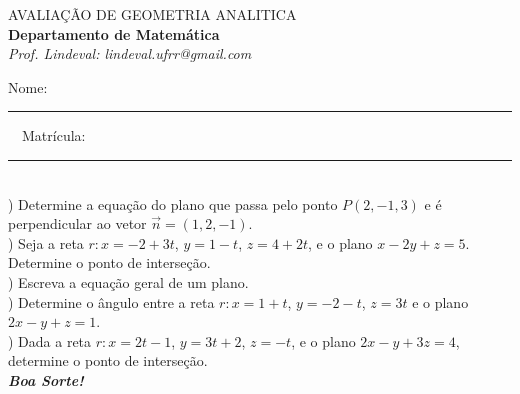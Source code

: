 \documentclass[12pt,a4paper]{article}
\begin{document}
\begin{center}
\large AVALIAÇÃO DE GEOMETRIA ANALITICA\\
{\large\bf Departamento de Matemática}\\[1mm] \textit{Prof. Lindeval: lindeval.ufrr@gmail.com}\\\end{center}

\noindent Nome: \rule{9cm}{0.3mm}\ \ Matrícula: \rule{3.5cm}{0.3mm}\\[1cm]
) Determine a equação do plano que passa pelo ponto $P(2,-1,3)$ e é perpendicular ao vetor $\vec{n} = (1,2,-1)$.\\
) Seja a reta $r: x = -2 + 3t$, $y = 1 - t$, $z = 4 + 2t$, e o plano $x - 2y + z = 5$. Determine o ponto de interseção.\\
) Escreva a equação geral de um plano.\\
) Determine o ângulo entre a reta $r: x = 1 + t$, $y = -2 - t$, $z = 3t$ e o plano $2x - y + z = 1$.\\
) Dada a reta $r: x = 2t - 1$, $y = 3t + 2$, $z = -t$, e o plano $2x - y + 3z = 4$, determine o ponto de interseção.\\
\vfill\hfill\bf{\textit{Boa Sorte!}}
\end{document}
